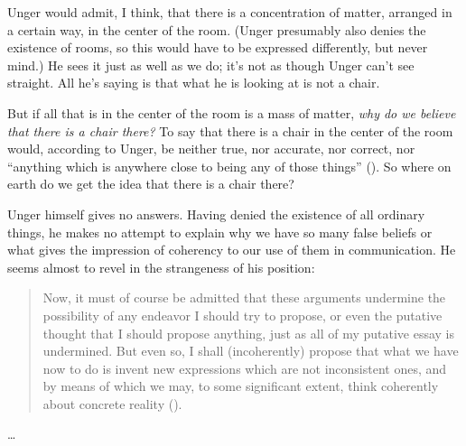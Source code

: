 \documentclass[11pt]{standalone} \newif\ifstandlone \standalonetrue
\newenvironment{squote}{%
	\begin{quote}\begin{singlespace}%
	}{%
	\end{singlespace}\end{quote}}
\begin{document}
\begin{spacing}{1.5}
Unger would admit, I think, that there is a concentration of matter,
arranged in a certain way, in the center of the room.  (Unger
presumably also denies the existence of rooms, so this would have to
be expressed differently, but never mind.)  He sees it just as well
as we do; it's not as though Unger can't see straight.  All he's
saying is that what he is looking at is not a chair.

But if all that is in the center of the room is a mass of matter, {\em
  why do we believe that there is a chair there?}  To say that there
is a chair in the center of the room would, according to Unger, be
neither true, nor accurate, nor correct, nor ``anything which is
anywhere close to being any of those things''
(\citeyear[148]{unger1979}).  So where on earth do we get the idea
that there is a chair there?

Unger himself gives no answers.  Having denied the existence of all
ordinary things, he makes no attempt to explain why we have so many
false beliefs or what gives the impression of coherency to our use of
them in communication.  He seems almost to revel in the strangeness of
his position:

\begin{squote}
Now, it must of course be admitted that these arguments
undermine the possibility of any endeavor I should try to propose, or
even the putative thought that I should propose anything, just as all
of my putative essay is undermined.  But even so, I shall
(incoherently) propose that what we have now to do is invent new
expressions which are not inconsistent ones, and by means of which we
may, to some significant extent, think coherently about concrete
reality (\citeyear[544]{unger1980b}).
\end{squote}

\ldots

\ifstandalone


\end{spacing}
\fi
\end{document}
